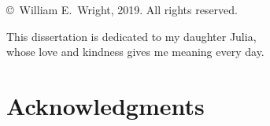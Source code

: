 % 
% 
% 
% 
%






\captionsetup[subfigure]{labelfont=rm}



   \frontmatter

   \pagestyle{prelim}
   
   
   \newpage
	
	 \thispagestyle{empty}
	 \begin{titlepage}
	 \vspace*{50em}
	 \begin{center}
		 \copyright \ William E.\ Wright, 2019.  All rights reserved.  
	 \end{center}
	 \end{titlepage}
	 \newpage
	
	
	 \thispagestyle{empty}
	 \vspace*{20em}
	 \begin{center}
	   This dissertation is dedicated to my daughter Julia, \\
	   whose love and kindness gives me meaning every day.
	 \end{center}
	 \newpage
   
   
   \doublespacing
   
   \tableofcontents
   \newpage
   
   
   \newpage
   
   \section*{Acknowledgments}
   
   
   \mainmatter
   
